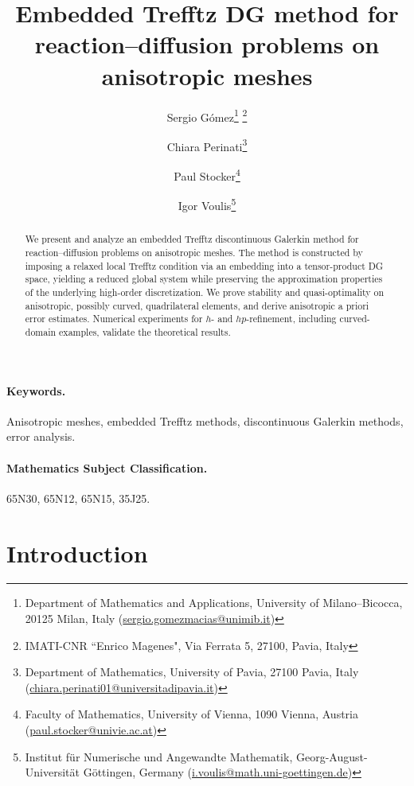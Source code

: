 \documentclass[a4paper,twoside,10pt]{article}
\numberwithin{equation}{section}
\begin{document}
	
	\title{Embedded Trefftz DG method for reaction--diffusion problems on anisotropic meshes}
	
	\author{Sergio G\'omez\thanks{Department of Mathematics and Applications, University of Milano--Bicocca, 20125 Milan, Italy \mbox{(\href{mailto:sergio.gomezmacias@unimib.it}{sergio.gomezmacias@unimib.it})} } \thanks{IMATI-CNR ``Enrico Magenes", Via Ferrata 5, 27100, Pavia, Italy}
		\and 
		Chiara Perinati\thanks{Department of Mathematics, University of Pavia, 27100 Pavia, Italy (\href{mailto:chiara.perinati01@universitadipavia.it}{chiara.perinati01@universitadipavia.it})}
		\and 
		Paul Stocker\thanks{Faculty of Mathematics, University of Vienna, 1090 Vienna, Austria (\href{mailto:paul.stocker@univie.ac.at}{paul.stocker@univie.ac.at})}
		\and	
		Igor Voulis\thanks{Institut für Numerische und Angewandte Mathematik, Georg-August-Universität Göttingen, Germany (\href{mailto:i.voulis@math.uni-goettingen.de}{i.voulis@math.uni-goettingen.de})} 
	}
	\date{}
	
	\maketitle
	
	
	\begin{abstract}
	\noindent
	We present and analyze an embedded Trefftz discontinuous Galerkin method for reaction--diffusion problems on anisotropic meshes. 
	The method is constructed by imposing a relaxed local Trefftz condition via an embedding into a tensor-product DG space, yielding a reduced global system while preserving the approximation properties of the underlying high-order discretization.
	We prove 
	stability and quasi-optimality on anisotropic, possibly curved, quadrilateral elements, and derive anisotropic a priori error estimates.
	Numerical experiments for $h$- and $hp$-refinement, including curved-domain examples, validate the theoretical results.
	\end{abstract}
	\paragraph{Keywords.} Anisotropic meshes, embedded Trefftz methods, discontinuous Galerkin methods, error analysis.
	\paragraph{Mathematics Subject Classification.} 
    65N30, 65N12, 65N15, 35J25.

	\section{Introduction}\label{sect::introduction}
	
\end{document}
